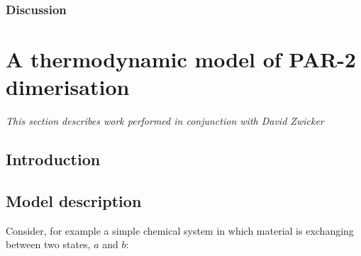\documentclass[12pt]{"article"}
\begin{document}
\subsubsection{Discussion}


\clearpage
\section{A thermodynamic model of PAR-2 dimerisation}

\textit{This section describes work performed in conjunction with David Zwicker}

\subsection{Introduction}

\subsection{Model description}





Consider, for example a simple chemical system in which material is exchanging between two states, $a$ and $b$:
\begin{center}
\end{center}
\end{document}
